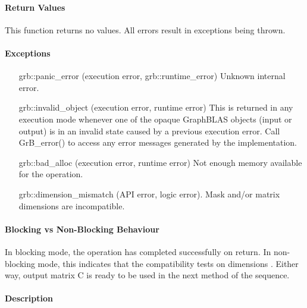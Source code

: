 \paragraph{Return Values}

This function returns no values.  All errors result in exceptions being thrown.


\paragraph{Exceptions}

\begin{itemize}[leftmargin=2.1in]
    \item[{\sf grb::panic\_error}]           (execution error, grb::runtime\_error) Unknown internal error.

    \item[{\sf grb::invalid\_object}] (execution error, runtime error) This is returned in any execution mode 
    whenever one of the opaque GraphBLAS objects (input or output) is in an invalid 
    state caused by a previous execution error.  Call {\sf GrB\_error()} to access 
    any error messages generated by the implementation.

    \item[{\sf grb::bad\_alloc}] (execution error, runtime error) Not enough memory available for the operation.

    \item[{\sf grb::dimension\_mismatch}] (API error, logic error). Mask and/or matrix
    dimensions are incompatible. 
\end{itemize}

\paragraph{Blocking vs Non-Blocking Behaviour}

In blocking mode, the operation has completed successfully on return.
In non-blocking mode, this indicates that the compatibility 
tests on dimensions . 
Either way, output matrix {\sf C} is ready to be used in the next method of
the sequence.

\paragraph{Description}

